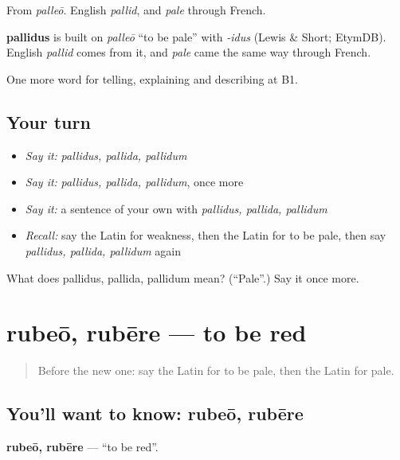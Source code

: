 From \emph{palleō}. English \emph{pallid}, and \emph{pale} through French.

\begin{cousinweb}
\textbf{pallidus} is built on \emph{palleō} \textquotedblleft{}to be pale\textquotedblright{} with \emph{-idus} (Lewis \& Short; EtymDB). English \emph{pallid} comes from it, and \emph{pale} came the same way through French.
\end{cousinweb}

\begin{grammarlens}[title={What you've built}]
One more word for telling, explaining and describing at B1.
\end{grammarlens}

\subsection*{Your turn}
\begin{itemize}
\raggedright
  \item \emph{Say it:} \emph{pallidus, pallida, pallidum}
  \item \emph{Say it:} \emph{pallidus, pallida, pallidum}, once more
  \item \emph{Say it:} a sentence of your own with \emph{pallidus, pallida, pallidum}
  \item \emph{Recall:} say the Latin for weakness, then the Latin for to be pale, then say \emph{pallidus, pallida, pallidum} again
\end{itemize}

\begin{tcolorbox}[breakable,colback=teal!4,colframe=teal!35!black,title={Before you move on}]
What does pallidus, pallida, pallidum mean? (\textquotedblleft{}Pale\textquotedblright{}.) Say it once more.
\end{tcolorbox}
\section[rubeō, rubēre]{rubeō, rubēre — to be red}

\label{lesson:LA-C522-rubeo}



\begin{quote}
Before the new one: say the Latin for to be pale, then the Latin for pale.
\end{quote}

\subsection*{You'll want to know: rubeō, rubēre}
\textbf{rubeō, rubēre} — \textquotedblleft{}to be red\textquotedblright{}.

